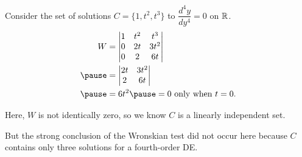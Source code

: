 \documentclass{beamer}
\begin{document}
\begin{frame}
\begin{example}
Consider the set of solutions $C=\{1,t^2,t^3\}$ to $\dfrac{d^4y}{dy^4}=0$ on $\mathbb{R}$.\pause
\begin{equation*}
\begin{aligned}
W &=
\begin{vmatrix}
1 & t^2 & t^3  \\
0 & 2t  & 3t^2 \\
0 & 2   & 6t   \\
\end{vmatrix}\\\pause
&=
\begin{vmatrix}
2t  & 3t^2 \\
2   & 6t   \\
\end{vmatrix}\\\pause
&=6t^2\pause
=0\text{ only when }t=0.
\end{aligned}
\end{equation*}

\vspace{-3mm}
Here, $W$ is not identically zero, so we know $C$ is a linearly independent set.\pause

But the strong conclusion of the Wronskian test did not occur here because $C$ contains only three solutions for a fourth-order DE\@.
\end{example}
\end{frame}
\end{document}
